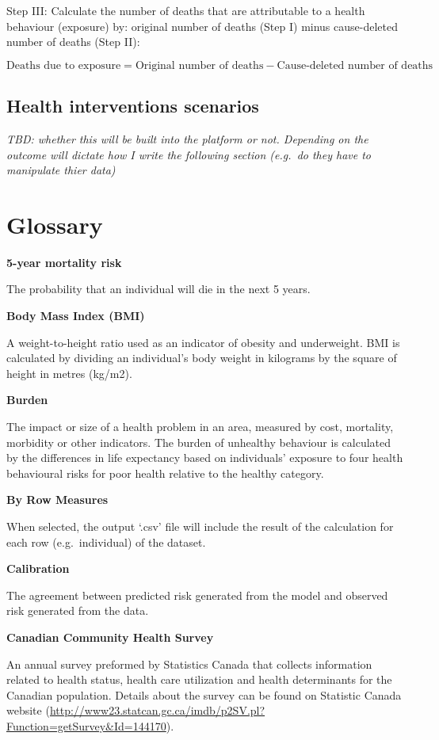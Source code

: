 \documentclass[]{book}
\begin{document}
Step III: Calculate the number of deaths that are attributable to a
health behaviour (exposure) by: original number of deaths (Step I) minus
cause-deleted number of deaths (Step II):

\[\text{Deaths due to exposure} = \text{Original number of deaths} - \text{Cause-deleted number of deaths}\]

\section{Health interventions
scenarios}\label{health-interventions-scenarios}

\emph{TBD: whether this will be built into the platform or not.
Depending on the outcome will dictate how I write the following section
(e.g.~do they have to manipulate thier data)}

\chapter{Glossary}\label{glossary}

\textbf{5-year mortality risk}

The probability that an individual will die in the next 5 years.

\textbf{Body Mass Index (BMI)}

A weight-to-height ratio used as an indicator of obesity and
underweight. BMI is calculated by dividing an individual's body weight
in kilograms by the square of height in metres (kg/m2).

\textbf{Burden}

The impact or size of a health problem in an area, measured by cost,
mortality, morbidity or other indicators. The burden of unhealthy
behaviour is calculated by the differences in life expectancy based on
individuals' exposure to four health behavioural risks for poor health
relative to the healthy category.

\textbf{By Row Measures}

When selected, the output `.csv' file will include the result of the
calculation for each row (e.g.~individual) of the dataset.

\textbf{Calibration}

The agreement between predicted risk generated from the model and
observed risk generated from the data.

\textbf{Canadian Community Health Survey}

An annual survey preformed by Statistics Canada that collects
information related to health status, health care utilization and health
determinants for the Canadian population. Details about the survey can
be found on Statistic Canada website
(\url{http://www23.statcan.gc.ca/imdb/p2SV.pl?Function=getSurvey\&Id=144170}).
\end{document}
